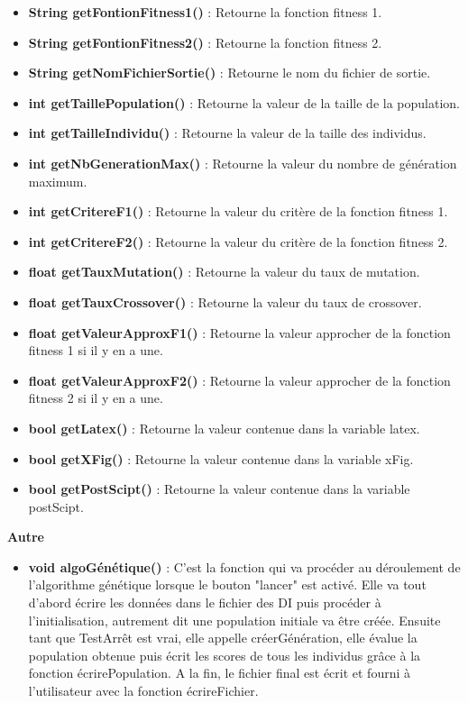 \documentclass[a4paper,11pt]{article}
\begin{document}
				\begin{itemize}
					\item \textbf{String getFontionFitness1()} : Retourne la fonction fitness 1.
					\item \textbf{String getFontionFitness2()} : Retourne la fonction fitness 2.
					\item \textbf{String getNomFichierSortie()} : Retourne le nom du fichier de sortie.
					\item \textbf{int getTaillePopulation()} : Retourne la valeur de la taille de la population.
					\item \textbf{int getTailleIndividu()} : Retourne la valeur de la taille des individus.
					\item \textbf{int getNbGenerationMax()} : Retourne la valeur du nombre de génération maximum.
					\item \textbf{int getCritereF1()} : Retourne la valeur du critère de la fonction fitness 1.
					\item \textbf{int getCritereF2()} : Retourne la valeur du critère de la fonction fitness 2.
					\item \textbf{float getTauxMutation()} : Retourne la valeur du taux de mutation.
					\item \textbf{float getTauxCrossover()} : Retourne la valeur du taux de crossover.
					\item \textbf{float getValeurApproxF1()} : Retourne la valeur approcher de la fonction fitness 1 si il y en a une.
					\item \textbf{float getValeurApproxF2()} : Retourne la valeur approcher de la fonction fitness 2 si il y en a une.
					\item \textbf{bool getLatex()} : Retourne la valeur contenue dans la variable latex.
					\item \textbf{bool getXFig()} : Retourne la valeur contenue dans la variable  xFig.
					\item \textbf{bool getPostScipt()} : Retourne la valeur contenue dans la variable  postScipt.\\
				\end{itemize}
			\textbf{Autre}
				\begin{itemize}
					\item \textbf{void algoGénétique()} : C'est la fonction qui va procéder au déroulement de l'algorithme génétique lorsque le bouton "lancer" est activé.  Elle va tout d'abord écrire les données dans le fichier des DI puis procéder à l'initialisation, autrement dit une population initiale va être créée. Ensuite tant que TestArrêt est vrai, elle appelle créerGénération, elle évalue la population obtenue puis écrit les scores de tous les individus grâce à la fonction écrirePopulation. A la fin, le fichier final est écrit et fourni à l'utilisateur avec la fonction écrireFichier.
				\end{itemize}
		
\end{document}
